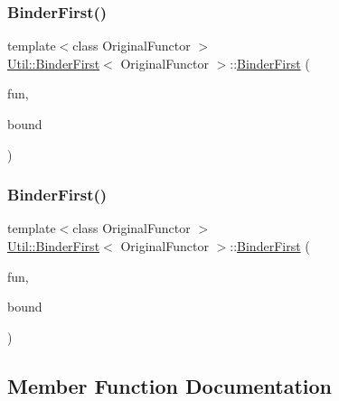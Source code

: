 \subsubsection{\texorpdfstring{BinderFirst()}{BinderFirst()}\hspace{0.1cm}{\footnotesize\ttfamily [1/2]}}
{\footnotesize\ttfamily template$<$class Original\+Functor $>$ \\
\mbox{\hyperlink{classUtil_1_1BinderFirst}{Util\+::\+Binder\+First}}$<$ Original\+Functor $>$\+::\mbox{\hyperlink{classUtil_1_1BinderFirst}{Binder\+First}} (\begin{DoxyParamCaption}\item[{const Original\+Functor \&}]{fun,  }\item[{Bound\+Type}]{bound }\end{DoxyParamCaption})\hspace{0.3cm}{\ttfamily [inline]}}

\mbox{\label{classUtil_1_1BinderFirst_a30caf0805ca9b22a13b3b79babd10054}} 
\subsubsection{\texorpdfstring{BinderFirst()}{BinderFirst()}\hspace{0.1cm}{\footnotesize\ttfamily [2/2]}}
{\footnotesize\ttfamily template$<$class Original\+Functor $>$ \\
\mbox{\hyperlink{classUtil_1_1BinderFirst}{Util\+::\+Binder\+First}}$<$ Original\+Functor $>$\+::\mbox{\hyperlink{classUtil_1_1BinderFirst}{Binder\+First}} (\begin{DoxyParamCaption}\item[{const Original\+Functor \&}]{fun,  }\item[{Bound\+Type}]{bound }\end{DoxyParamCaption})\hspace{0.3cm}{\ttfamily [inline]}}



\subsection{Member Function Documentation}
\mbox{\label{classUtil_1_1BinderFirst_aaf3277caca5fced7454825a2f2920847}} 
